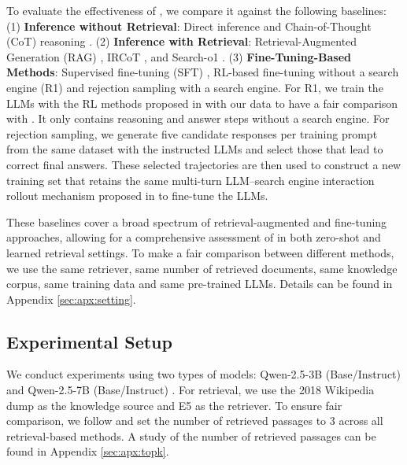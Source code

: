 To evaluate the effectiveness of \Ours, we compare it against the following baselines:
%
(1) \textbf{Inference without Retrieval}: Direct inference and Chain-of-Thought (CoT) reasoning \citep{wei2022chain}.
(2) \textbf{Inference with Retrieval}: Retrieval-Augmented Generation (RAG) \citep{lewis2020retrieval}, IRCoT \citep{trivedi2022interleaving}, and Search-o1 \citep{li2025search}.
(3) \textbf{Fine-Tuning-Based Methods}: Supervised fine-tuning (SFT) \citep{chung2024scaling}, RL-based fine-tuning without a search engine (R1) \citep{guo2025deepseek} and rejection sampling \citep{ahn2024large} with a search engine. 
For R1, we train the LLMs with the RL methods proposed in \cite{guo2025deepseek} with our data to have a fair comparison with \Ours. It only contains reasoning and answer steps without a search engine.
For rejection sampling, we generate five candidate responses per training prompt from the same dataset with the instructed LLMs and select those that lead to correct final answers. These selected trajectories are then used to construct a new training set that retains the same multi-turn LLM–search engine interaction rollout mechanism proposed in \Ours to fine-tune the LLMs.

These baselines cover a broad spectrum of retrieval-augmented and fine-tuning approaches, allowing for a comprehensive assessment of \Ours in both zero-shot and learned retrieval settings.
To make a fair comparison between different methods, we use the same retriever, same number of retrieved documents, same knowledge corpus, same training data and same pre-trained LLMs. Details can be found in Appendix \ref{sec:apx:setting}.

\subsection{Experimental Setup}\label{sec:exp-setup}

We conduct experiments using two types of models: Qwen-2.5-3B (Base/Instruct) and Qwen-2.5-7B (Base/Instruct) \citep{yang2024qwen2}.
For retrieval, we use the 2018 Wikipedia dump \citep{karpukhin2020dense} as the knowledge source and E5 \citep{wang2022text} as the retriever. To ensure fair comparison, we follow \cite{lin2023ra} and set the number of retrieved passages to 3 across all retrieval-based methods. 
A study of the number of retrieved passages can be found in Appendix \ref{sec:apx:topk}.


